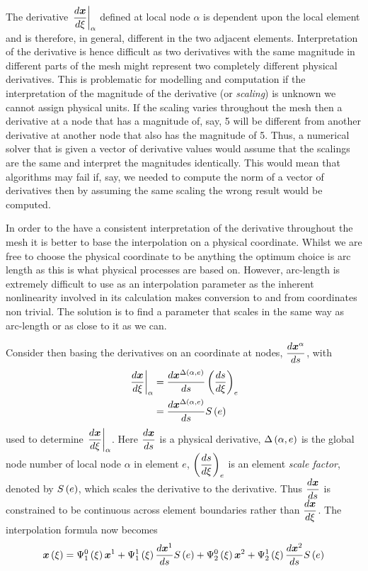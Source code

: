 The derivative $\evalat{\dby{\vect{x}}{\xi}}{\alpha}$ defined at local node
$\alpha$ is dependent upon the local element \xicoord and is therefore, in
general, different in the two adjacent elements. Interpretation of the
derivative is hence difficult as two derivatives with the same magnitude in
different parts of the mesh might represent two completely different physical
derivatives. This is problematic for modelling and computation if the interpretation of the
magnitude of the derivative (or \emph{scaling}) is unknown \eg we cannot
assign physical units. If the scaling varies throughout the mesh then a
derivative at a node that has a magnitude of, say, 5 will be different from
another derivative at another node that also has the magnitude of 5. Thus, a
numerical solver that is given a vector of derivative values would assume that
the scalings are the same and interpret the magnitudes identically. This would
mean that algorithms may fail \eg if, say, we needed to compute the
norm of a vector of derivatives then by assuming the same scaling the wrong
result would be computed.

In order to the have a consistent interpretation of the derivative
throughout the mesh it is better to base the interpolation on a physical
coordinate. Whilst we are free to choose the physical coordinate to be
anything the optimum choice is arc length as this is what physical processes
are based on. However, arc-length is extremely difficult to use as an
interpolation parameter as the inherent nonlinearity involved in its
calculation makes conversion to and from coordinates non trivial.
The solution is to find a parameter that scales
in the same way as arc-length or as close to it as we can. 

Consider then basing the derivatives on an \arclen coordinate at nodes,
$\dby{\nodept{\vect{x}}{\alpha}}{s}$, with
\begin{equation}
  \begin{split}
    \evalat{\dby{\vect{x}}{\xi}}{\alpha}&=\dby{\nodept{\vect{x}}{
        \fnof{\Delta}{\alpha,e}}}{s}\pbrac{\dby{s}{\xi}}_{e} \\ &=
    \dby{\nodept{\vect{x}}{\fnof{\Delta}{\alpha,e}}}{s}\esfone{e}
  \end{split}
  \label{eqn:xitosch}
\end{equation}
used to determine $\evalat{\dby{\vect{x}}{\xi}}{\alpha}$. Here
$\dby{\vect{x}}{s}$ is a physical \arclen derivative,
$ \Delta\left( \alpha,e \right) $ is the global node number of local node $\alpha$ in
element $e$, $\left(  \dfrac{ d s}{d \xi}  \right)_{e}$ is an element \emph{scale factor}, denoted by $   S \left( {e} \right)  $, which scales
the \arclen derivative to the \xicoord derivative.  Thus $\dby{\vect{x}}{s}$
is constrained to be continuous across element boundaries rather than
$\dby{\vect{x}}{\xi}$. The \cubicherm interpolation formula now becomes
\begin{equation}
  \fnof{\vect{x}}{\xi}=\chbfn{1}{0}{\xi}\nodept{\vect{x}}{1}+\chbfn{1}{1}{\xi}
  \dby{\nodept{\vect{x}}{1}}{s}\esfone{e}+\chbfn{2}{0}{\xi}\nodept{\vect{x}}{2}+
  \chbfn{2}{1}{\xi}\dby{\nodept{\vect{x}}{2}}{s}\esfone{e}
  \label{eqn:chseinterpolation}
\end{equation}

